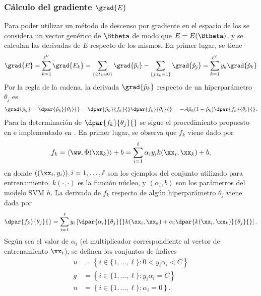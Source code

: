 %
\subsubsection{Cálculo del gradiente $\grad{E}$}
\label{se:gradE}
%
Para poder utilizar un método de descenso por gradiente en el espacio
de los  se considera un vector genérico de 
$\Btheta$ de modo que $E=E(\Btheta)$, y se calculan las derivadas de
$E$ respecto de los mismos.
En primer lugar, se tiene
%
\begin{align}
\label{gradE}
  \grad{E} = \sum_{k=1}^{\ell^V} \grad{E_k} =
  \sum_{ \{i:t_k=0\}  } \grad{\hat{p}_i}
  - \sum_{ \{j:t_k=1\}  } \grad{\hat{p}_j}
  = \sum_{k=1}^{\ell^V} y_k \grad{\hat{p}_k}
\end{align}
%
Por la regla de la cadena, la derivada $\grad{\hat{p}_k}$ respecto de
un hiperparámetro ${\theta_j}$ es
%
\begin{align}
  \grad{\hat{p}_k}=\dpar{\hat{p}_k}{\theta_i}{} =
  \dpar{\hat{p}_k}{f_k}{}\dpar{f_k}{\theta_i}{} =
  -A\hat{p}_k(1-\hat{p}_k)\dpar{f_k}{\theta_i}{}.
  \label{eq:deriv-pk-thetak}
\end{align}
%
Para la determinación de $\dpar{f_k}{\theta_j}{}$ se sigue el
procedimiento propuesto en \cite{keerthi,glasmachers} e implementado
en \cite{shark}. En primer lugar, se observa que $f_k$ viene dado por
%
\begin{align}
  f_k = \langle \ww,\Phi(\xx_k)\rangle+b = \sum_{i=1}^\ell \alpha_i y_i k(\xx_i,\xx_k) + b,
  \label{fk}
\end{align}
%
en donde $((\xx_i,y_i)),i=1,\ldots,\ell$ son los ejemplos del conjunto
utilizado para entrenamiento, $k(\cdot,\cdot)$ es la función
núcleo, y $(\alpha_i, b)$ son los parámetros del modelo SVM $h$.
La derivada de $f_k$ respecto de algún hiperparámetro $\theta_j$ viene
dada por
\begin{align}
  \dpar{f_k}{\theta_j}{} = \sum_{i=1}^\ell y_i
  \left[\dpar{\alpha_i}{\theta_j}{} k(\xx_i,\xx_k) + \alpha_i
    \dpar{k(\xx_i,\xx_k)}{\theta_j}{} \right].
\end{align}
%
Según sea el valor de $\alpha_i$ (el multiplicador correspondiente al
vector de entrenamiento $\xx_i$), se definen los conjuntos de índices
%
\begin{align}
  \label{unbounded-sv-set}
  u &= \left\{i\in\{1,\ldots,\ell\}:0<y_i\alpha_i<C \right\}\\
  \label{bounded-sv-set}
  g &= \left\{i\in\{1,\ldots,\ell\}: y_i\alpha_i=C \right\}\\
  n &= \left\{i\in\{1,\ldots,\ell\}: \alpha_i=0 \right\}.
\end{align}
